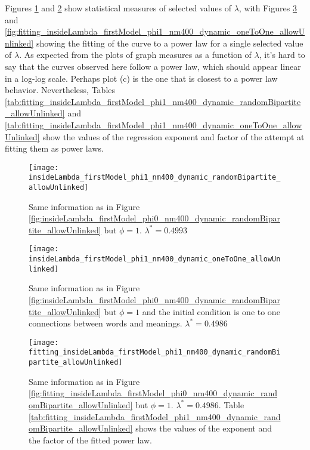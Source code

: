 Figures \ref{fig:insideLambda_firstModel_phi1_nm400_dynamic_randomBipartite_allowUnlinked} and \ref{fig:insideLambda_firstModel_phi1_nm400_dynamic_oneToOne_allowUnlinked} show statistical measures of selected values of $\lambda$, with Figures \ref{fig:fitting_insideLambda_firstModel_phi1_nm400_dynamic_randomBipartite_allowUnlinked} and \ref{fig:fitting_insideLambda_firstModel_phi1_nm400_dynamic_oneToOne_allowUnlinked} showing the fitting of the curve to a power law for a single selected value of $\lambda$.
As expected from the plots of graph measures as a function of $\lambda$, it's hard to say that the curves observed here follow a power law, which should appear linear in a log-log scale.
Perhaps plot (c) is the one that is closest to a power law behavior.
Nevertheless, Tables \ref{tab:fitting_insideLambda_firstModel_phi1_nm400_dynamic_randomBipartite_allowUnlinked} and \ref{tab:fitting_insideLambda_firstModel_phi1_nm400_dynamic_oneToOne_allowUnlinked} show the values of the regression exponent and factor of the attempt at fitting them as power laws.

\begin{figure}
  \centering
  \texttt{[image: insideLambda\_firstModel\_phi1\_nm400\_dynamic\_randomBipartite\_allowUnlinked]}
  \caption{Same information as in Figure \ref{fig:insideLambda_firstModel_phi0_nm400_dynamic_randomBipartite_allowUnlinked} but $\phi=1$. $\lambda^* = 0.4993$}
  \label{fig:insideLambda_firstModel_phi1_nm400_dynamic_randomBipartite_allowUnlinked}
\end{figure}

\begin{figure}
  \centering
  \texttt{[image: insideLambda\_firstModel\_phi1\_nm400\_dynamic\_oneToOne\_allowUnlinked]}
  \caption{Same information as in Figure \ref{fig:insideLambda_firstModel_phi0_nm400_dynamic_randomBipartite_allowUnlinked} but $\phi=1$ and the initial condition is one to one connections between words and meanings. $\lambda^* = 0.4986$}
  \label{fig:insideLambda_firstModel_phi1_nm400_dynamic_oneToOne_allowUnlinked}
\end{figure}

\begin{figure}
  \centering
  \texttt{[image: fitting\_insideLambda\_firstModel\_phi1\_nm400\_dynamic\_randomBipartite\_allowUnlinked]}
  \caption{Same information as in Figure \ref{fig:fitting_insideLambda_firstModel_phi0_nm400_dynamic_randomBipartite_allowUnlinked} but $\phi=1$. $\lambda^*=0.4986$.
Table \ref{tab:fitting_insideLambda_firstModel_phi1_nm400_dynamic_randomBipartite_allowUnlinked} shows the values of the exponent and the factor of the fitted power law.}
  \label{fig:fitting_insideLambda_firstModel_phi1_nm400_dynamic_randomBipartite_allowUnlinked}
\end{figure}

